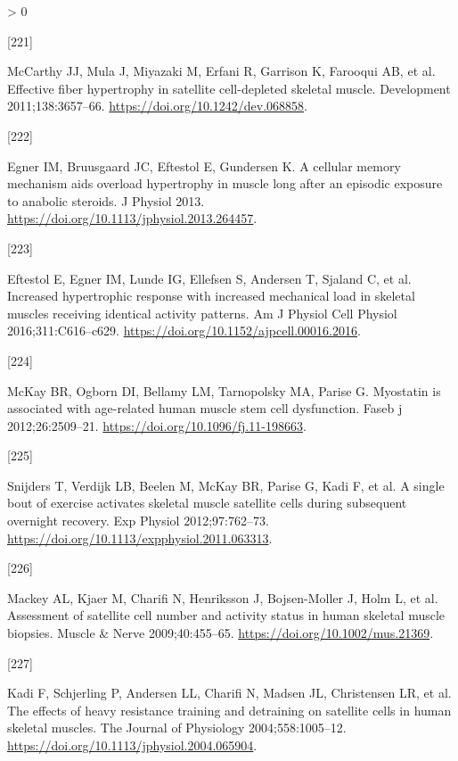 \documentclass[twoside,10pt]{gihclass} %
\newlength{\cslhangindent}
\newlength{\csllabelwidth}
\newenvironment{CSLReferences}[3] %
 {%
  \setlength{\parindent}{0pt}
  \ifodd #1 \everypar{\setlength{\hangindent}{\cslhangindent}}\ignorespaces\fi
  \ifnum #2 > 0
  \setlength{\parskip}{#2\baselineskip}
  \fi
 }%
 {}
\newcommand{\CSLLeftMargin}[1]{\parbox[t]{\maxof{\widthof{#1}}{\csllabelwidth}}{#1}}
\newcommand{\CSLRightInline}[1]{\parbox[t]{\linewidth}{#1}}
\begin{document}
\begin{CSLReferences}{0}{0}
\leavevmode\hypertarget{ref-RN2864}{}%
\CSLLeftMargin{{[}221{]} }
\CSLRightInline{McCarthy JJ, Mula J, Miyazaki M, Erfani R, Garrison K, Farooqui AB, et al. Effective fiber hypertrophy in satellite cell-depleted skeletal muscle. Development 2011;138:3657--66. \url{https://doi.org/10.1242/dev.068858}.}

\leavevmode\hypertarget{ref-RN912}{}%
\CSLLeftMargin{{[}222{]} }
\CSLRightInline{Egner IM, Bruusgaard JC, Eftestol E, Gundersen K. A cellular memory mechanism aids overload hypertrophy in muscle long after an episodic exposure to anabolic steroids. J Physiol 2013. \url{https://doi.org/10.1113/jphysiol.2013.264457}.}

\leavevmode\hypertarget{ref-RN2104}{}%
\CSLLeftMargin{{[}223{]} }
\CSLRightInline{Eftestol E, Egner IM, Lunde IG, Ellefsen S, Andersen T, Sjaland C, et al. Increased hypertrophic response with increased mechanical load in skeletal muscles receiving identical activity patterns. Am J Physiol Cell Physiol 2016;311:C616--c629. \url{https://doi.org/10.1152/ajpcell.00016.2016}.}

\leavevmode\hypertarget{ref-RN2872}{}%
\CSLLeftMargin{{[}224{]} }
\CSLRightInline{McKay BR, Ogborn DI, Bellamy LM, Tarnopolsky MA, Parise G. Myostatin is associated with age-related human muscle stem cell dysfunction. Faseb j 2012;26:2509--21. \url{https://doi.org/10.1096/fj.11-198663}.}

\leavevmode\hypertarget{ref-RN1048}{}%
\CSLLeftMargin{{[}225{]} }
\CSLRightInline{Snijders T, Verdijk LB, Beelen M, McKay BR, Parise G, Kadi F, et al. A single bout of exercise activates skeletal muscle satellite cells during subsequent overnight recovery. Exp Physiol 2012;97:762--73. \url{https://doi.org/10.1113/expphysiol.2011.063313}.}

\leavevmode\hypertarget{ref-RN2081}{}%
\CSLLeftMargin{{[}226{]} }
\CSLRightInline{Mackey AL, Kjaer M, Charifi N, Henriksson J, Bojsen-Moller J, Holm L, et al. Assessment of satellite cell number and activity status in human skeletal muscle biopsies. Muscle \& Nerve 2009;40:455--65. \url{https://doi.org/10.1002/mus.21369}.}

\leavevmode\hypertarget{ref-RN2617}{}%
\CSLLeftMargin{{[}227{]} }
\CSLRightInline{Kadi F, Schjerling P, Andersen LL, Charifi N, Madsen JL, Christensen LR, et al. The effects of heavy resistance training and detraining on satellite cells in human skeletal muscles. The Journal of Physiology 2004;558:1005--12. \url{https://doi.org/10.1113/jphysiol.2004.065904}.}


\end{CSLReferences}
\end{document}
